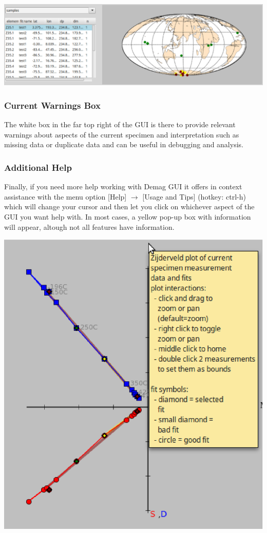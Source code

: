 \documentclass[11pt]{book}
\begin{document}
{{\includegraphics[width=15 cm]{EPSFiles/demag_gui_VGPViewer.eps}

\subsubsection{Current Warnings Box}\label{warn-box}

The white box in the far top right of the GUI is there to provide relevant warnings about aspects of the current specimen and interpretation such as missing data or duplicate data and can be useful in debugging and analysis.

\subsubsection{Additional Help}\label{add-help}

Finally, if you need more help working with Demag GUI it offers in context assistance with the menu option [Help] $\rightarrow$ [Usage and Tips] (hotkey: ctrl-h) which will change your cursor and then let you click on whichever aspect of the GUI you want help with. In most cases, a yellow pop-up box with information will appear, altough not all features have information.

\includegraphics[width=10 cm]{EPSFiles/demag_gui_ContextHelp.eps}

}}
\end{document}
